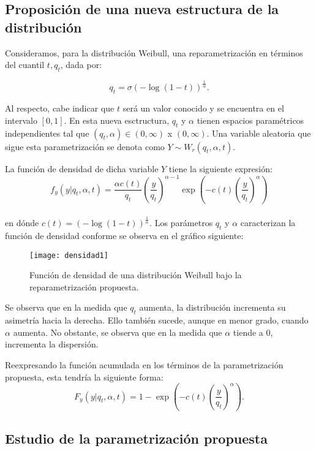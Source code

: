 \documentclass{report}
\begin{document}
\subsection{Proposición de una nueva estructura de la distribución}

Consideramos, para la distribución Weibull, una reparametrización en términos del cuantil $t, q_{t}$, dada por:

\[q_{t}=\sigma\left( -\log\left( 1-t \right) \right)^{\frac{1}{\alpha}}.\]

Al respecto, cabe indicar que $t$ será un valor conocido y se encuentra en el intervalo $[0,1]$. En esta nueva esctructura, $q_{t}$ y $\alpha$ tienen espacios paramétricos independientes tal que $(q_{t},\alpha) \in (0,\infty)$ x $(0,\infty)$. Una variable aleatoria que sigue esta parametrización se denota como $Y \sim W_{r}(q_{t},\alpha,t)$.

La función de densidad de dicha variable $Y$ tiene la siguiente expresión:
\begin{equation}
f_{y}(y| q_{t},\alpha,t)=\frac{\alpha c(t)}{q_{t}}\left( \frac{y}{q_{t}} \right)^{\alpha-1}\exp\left( -c(t)\left( \frac{y}{q_{t}} \right)^{\alpha} \right)
\end{equation}
\\
\noindent en dónde $c(t)= \left( -\log(1-t) \right)^{\frac{1}{\alpha}}$. Los parámetros $q_{t}$ y $\alpha$ caracterizan la función de densidad conforme se observa en el gráfico siguiente:

\begin{figure}[H]
\texttt{[image: densidad1]}
\caption{Función de densidad de una distribución Weibull bajo la reparametrización propuesta.}
\end{figure}

\noindent Se observa que en la medida que $q_{t}$ aumenta, la distribución incrementa su asimetría hacia la derecha. Ello también sucede, aunque en menor grado, cuando $\alpha$ aumenta. No obstante, se observa que en la medida que $\alpha$ tiende a 0, incrementa la dispersión.

Reexpresando la función acumulada en los términos de la parametrización propuesta, esta tendría la siguiente forma:
\begin{equation} \label{eq:1}
F_{y}\left(y| q_{t},\alpha,t \right)=1-\exp\left( -c(t)\left( \frac{y}{q_{t}} \right)^{\alpha} \right).
\end{equation}
\subsection{Estudio de la parametrización propuesta}
\end{document}
